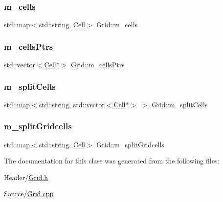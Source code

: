 \subsubsection{\texorpdfstring{m\_cells}{m\_cells}}
{\footnotesize\ttfamily std\+::map$<$std\+::string, \mbox{\hyperlink{class_cell}{Cell}}$>$ Grid\+::m\+\_\+cells}

\mbox{\label{class_grid_ad2fee42b47a1d2fdb9a490ebf52aa944}} 
\subsubsection{\texorpdfstring{m\_cellsPtrs}{m\_cellsPtrs}}
{\footnotesize\ttfamily std\+::vector$<$\mbox{\hyperlink{class_cell}{Cell}}$\ast$$>$ Grid\+::m\+\_\+cells\+Ptrs}

\mbox{\label{class_grid_aaa5f3ec4dfd546d45ba997a89296cad9}} 
\subsubsection{\texorpdfstring{m\_splitCells}{m\_splitCells}}
{\footnotesize\ttfamily std\+::map$<$std\+::string, std\+::vector$<$\mbox{\hyperlink{class_cell}{Cell}}$\ast$$>$ $>$ Grid\+::m\+\_\+split\+Cells}

\mbox{\label{class_grid_ab2dedb463583b59622965acc2a6bedc7}} 
\subsubsection{\texorpdfstring{m\_splitGridcells}{m\_splitGridcells}}
{\footnotesize\ttfamily std\+::map$<$std\+::string, \mbox{\hyperlink{class_cell}{Cell}}$>$ Grid\+::m\+\_\+split\+Gridcells}



The documentation for this class was generated from the following files\+:\begin{DoxyCompactItemize}
\item 
Header/\mbox{\hyperlink{_grid_8h}{Grid.\+h}}\item 
Source/\mbox{\hyperlink{_grid_8cpp}{Grid.\+cpp}}\end{DoxyCompactItemize}
